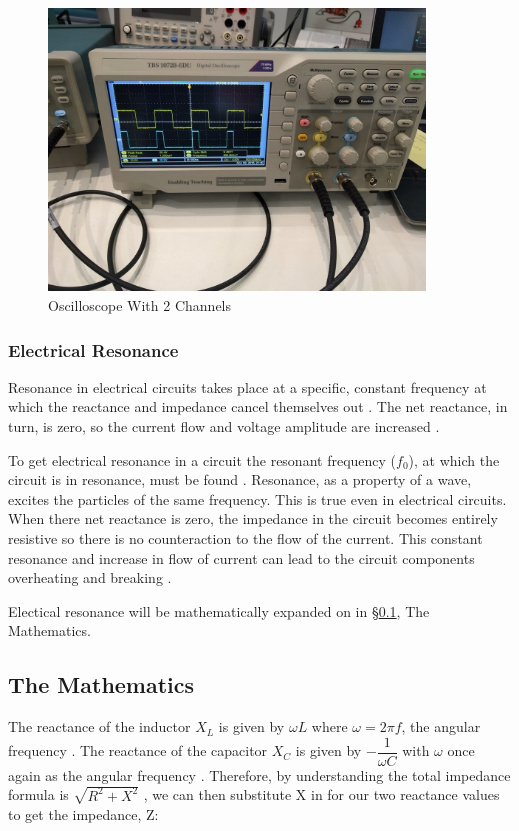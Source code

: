\documentclass[12pt]{article}
\begin{document}
\begin{figure}[H]
    \centering
    \includegraphics[width=10cm]{oscillo.jpg}
    \caption{\centering \footnotesize{Oscilloscope With 2 Channels \protect\cite{oscillopic}}}
\end{figure}

\subsubsection{Electrical Resonance} \label{sec:1.2.2}

Resonance in electrical circuits takes place at a specific, constant frequency at which the reactance and impedance cancel themselves out
\cite{geekresonance}.
The net reactance, in turn, is zero, so the current flow and voltage amplitude are increased
\cite{geekresonance}.

To get electrical resonance in a circuit the resonant frequency ($f_0$), at which the circuit is in resonance, must be found
\cite{geekresonance,eeresonance}.
Resonance, as a property of a wave, excites the particles of the same frequency. This is true even in electrical circuits.
When there net reactance is zero, the impedance in the circuit becomes entirely resistive so there is no counteraction to the flow of the current.
This constant resonance and increase in flow of current can lead to the circuit components overheating and breaking
\cite{geekresonance}.

Electical resonance will be mathematically expanded on in §\ref{sec:1.3}, The Mathematics.

\subsection{The Mathematics}\label{sec:1.3}

The reactance of the inductor $X_L$ is given by $\omega L$ where $\omega = 2 \pi f$, the angular frequency
\cite{UCDlcr,isaacimpedance}.
The reactance of the capacitor $X_C$ is given by $- \dfrac{1}{\omega C}$ with $\omega$ once again as the angular frequency
\cite{UCDlcr,isaacimpedance}.
Therefore, by understanding the total impedance formula is $\sqrt{R^2 + X^2}$
\cite{isaacimpedance},
we can then substitute X in for our two reactance values to get the impedance, Z:
\end{document}
